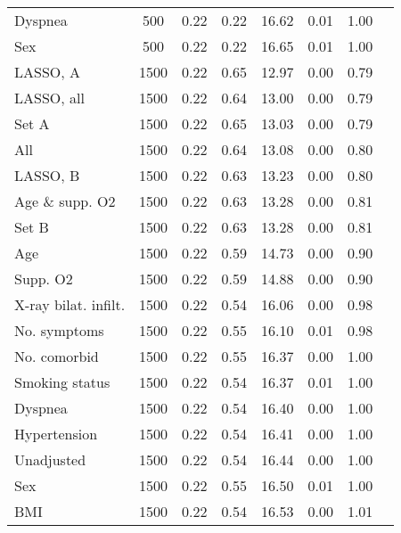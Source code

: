 \documentclass{article}
\begin{document}
{\begin{longtable}{lccccccc}
Dyspnea & 500 & 0.22 & 0.22 & 16.62 & 0.01 & 1.00\\
Sex & 500 & 0.22 & 0.22 & 16.65 & 0.01 & 1.00\\ \midrule
LASSO, A & 1500 & 0.22 & 0.65 & 12.97 & 0.00 & 0.79\\
LASSO, all & 1500 & 0.22 & 0.64 & 13.00 & 0.00 & 0.79\\
Set A & 1500 & 0.22 & 0.65 & 13.03 & 0.00 & 0.79\\
All & 1500 & 0.22 & 0.64 & 13.08 & 0.00 & 0.80\\
LASSO, B & 1500 & 0.22 & 0.63 & 13.23 & 0.00 & 0.80\\
Age \& supp. O2 & 1500 & 0.22 & 0.63 & 13.28 & 0.00 & 0.81\\
Set B & 1500 & 0.22 & 0.63 & 13.28 & 0.00 & 0.81\\
Age & 1500 & 0.22 & 0.59 & 14.73 & 0.00 & 0.90\\
Supp. O2 & 1500 & 0.22 & 0.59 & 14.88 & 0.00 & 0.90\\
X-ray bilat. infilt. & 1500 & 0.22 & 0.54 & 16.06 & 0.00 & 0.98\\
No. symptoms & 1500 & 0.22 & 0.55 & 16.10 & 0.01 & 0.98\\
No. comorbid & 1500 & 0.22 & 0.55 & 16.37 & 0.00 & 1.00\\
Smoking status & 1500 & 0.22 & 0.54 & 16.37 & 0.01 & 1.00\\
Dyspnea & 1500 & 0.22 & 0.54 & 16.40 & 0.00 & 1.00\\
Hypertension & 1500 & 0.22 & 0.54 & 16.41 & 0.00 & 1.00\\
Unadjusted & 1500 & 0.22 & 0.54 & 16.44 & 0.00 & 1.00\\
Sex & 1500 & 0.22 & 0.55 & 16.50 & 0.01 & 1.00\\
BMI & 1500 & 0.22 & 0.54 & 16.53 & 0.00 & 1.01\\
\bottomrule
\hline
\end{longtable}
}

\clearpage
\end{document}
